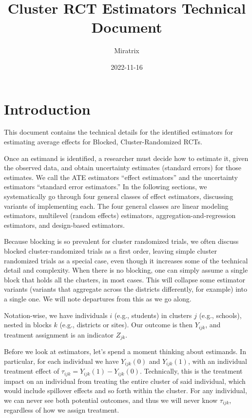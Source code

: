 \documentclass[12pt]{article}
\title{Cluster RCT Estimators Technical Document}
\author{Miratrix}
\date{2022-11-16}
\begin{document}
\maketitle

\section{Introduction}\label{introduction}

This document contains the technical details for the identified estimators for estimating average effects for Blocked, Cluster-Randomized RCTs.

Once an estimand is identified, a researcher must decide how to estimate
it, given the observed data, and obtain uncertainty estimates (standard
errors) for those estimates. We call the ATE estimators ``effect estimators'' and the uncertainty estimators ``standard error estimators.'' 
In the following sections, we systematically go through four general classes of effect estimators, discussing variants of implementing each.
The four general classes are linear modeling estimators, multilevel (random effects) estimators, aggregation-and-regression estimators, and design-based estimators.


Because blocking is so prevalent for cluster randomized trials, we often discuss blocked cluster-randomized trials as a first order, leaving simple cluster randomized trials as a special case, even though it increases some of the technical detail and complexity.
When there is no blocking, one can simply assume a single block that holds all the clusters, in most cases.
This will collapse some estimator variants (variants that aggregate across the districts differently, for example) into a single one.
We will note departures from this as we go along.

Notation-wise, we have individuals $i$ (e.g., students) in clusters $j$ (e.g., schools), nested in blocks $k$ (e.g., districts or sites).
Our outcome is then $Y_{ijk}$, and treatment assignment is an indicator $Z_{jk}$.

Before we look at estimators, let's spend a moment thinking about estimands.
In particular, for each individual we have $Y_{ijk}(0)$ and $Y_{ijk}(1)$, with an individual treatment effect of $\tau_{ijk} = Y_{ijk}(1) - Y_{ijk}(0)$.
Technically, this is the treatment impact on an individual from treating the entire cluster of said individual, which would include spillover effects and so forth within the cluster.
For any individual, we can never see both potential outcomes, and thus we will never know $\tau_{ijk}$, regardless of how we assign treatment.
\end{document}
